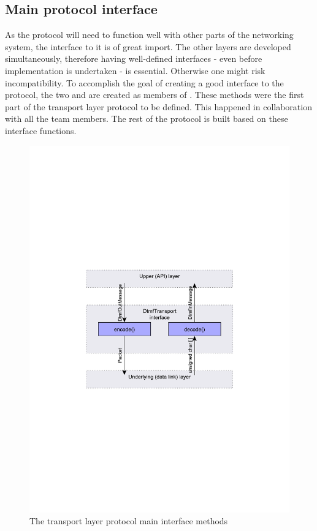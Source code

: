 \subsection{Main protocol interface}
As the protocol will need to function well with other parts of the networking system, the interface to it is of great import. The other layers are developed simultaneously, therefore having well-defined interfaces - even before implementation is undertaken - is essential. Otherwise one might risk incompatibility. To accomplish the goal of creating a good interface to the protocol, the two  and  are created as members of . These methods were the first part of the transport layer protocol to be defined. This happened in collaboration with all the team members. The rest of the protocol is built based on these interface functions.

\begin{figure}[htb]
 \centering
 \includegraphics[scale=0.66,trim=0 280 0 275]{content/graphics/transport/trans_encode_decode.pdf}%
 \caption{The transport layer protocol main interface methods}
 \label{fig:trans_encode_decode}
\end{figure}

